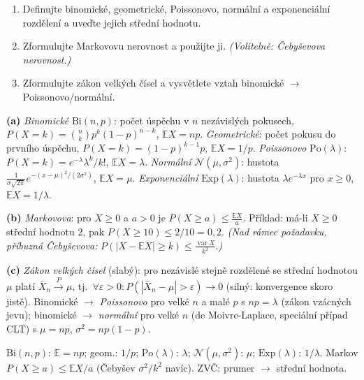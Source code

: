 \begin{zadani}
\begin{enumerate}[label=(\alph*)]
  \item {} Definujte binomické, geometrické, Poissonovo, normální a exponenciální rozdělení a uveďte jejich střední hodnotu.
  \item {} Zformulujte Markovovu nerovnost a použijte ji. \emph{(Volitelně: Čebyševova nerovnost.)}
  \item {} Zformulujte zákon velkých čísel a vysvětlete vztah binomické $\to$ Poissonovo/normální.
\end{enumerate}
\end{zadani}

\begin{reseni}
\textbf{(a)} \emph{Binomické} $\mathrm{Bi}(n,p)$: počet úspěchu v $n$ nezávislých pokusech, $P(X=k)=\binom{n}{k}p^k(1-p)^{n-k}$, $\mathbb{E}X=np$. \emph{Geometrické}: počet pokusu do prvního úspěchu, $P(X=k)=(1-p)^{k-1}p$, $\mathbb{E}X=1/p$. \emph{Poissonovo} $\mathrm{Po}(\lambda)$: $P(X=k)=e^{-\lambda}\lambda^k/k!$, $\mathbb{E}X=\lambda$. \emph{Normální} $\mathcal{N}(\mu,\sigma^2)$: hustota $\frac{1}{\sigma\sqrt{2\pi}}e^{-(x-\mu)^2/(2\sigma^2)}$, $\mathbb{E}X=\mu$. \emph{Exponenciální} $\mathrm{Exp}(\lambda)$: hustota $\lambda e^{-\lambda x}$ pro $x\ge0$, $\mathbb{E}X=1/\lambda$.

\textbf{(b)} \emph{Markovova}: pro $X\ge0$ a $a>0$ je $P(X\ge a)\le\frac{\mathbb{E}X}{a}$. Příklad: má-li $X\ge0$ střední hodnotu $2$, pak $P(X\ge10)\le 2/10=0{,}2$. \emph{(Nad rámec požadavku, příbuzná Čebyševova:} $P(|X-\mathbb{E}X|\ge k)\le\frac{\operatorname{var}X}{k^2}$.\emph{)}

\textbf{(c)} \emph{Zákon velkých čísel} (slabý): pro nezávislé stejně rozdělené se střední hodnotou $\mu$ platí $\bar X_n\xrightarrow{P}\mu$, tj.\ $\forall\varepsilon>0:P(|\bar X_n-\mu|>\varepsilon)\to0$ (silný: konvergence skoro jistě). Binomické $\to$ \emph{Poissonovo} pro velké $n$ a malé $p$ s $np=\lambda$ (zákon vzácných jevu); binomické $\to$ \emph{normální} pro velké $n$ (de Moivre-Laplace, speciální případ CLT) s $\mu=np$, $\sigma^2=np(1-p)$.
\end{reseni}

\begin{jadro}
$\mathrm{Bi}(n,p)$: $\mathbb{E}=np$; geom.: $1/p$; $\mathrm{Po}(\lambda)$: $\lambda$; $\mathcal{N}(\mu,\sigma^2)$: $\mu$; $\mathrm{Exp}(\lambda)$: $1/\lambda$. Markov $P(X\ge a)\le\mathbb{E}X/a$ (Čebyšev $\sigma^2/k^2$ navíc). ZVČ: prumer $\to$ střední hodnota.
\end{jadro}

